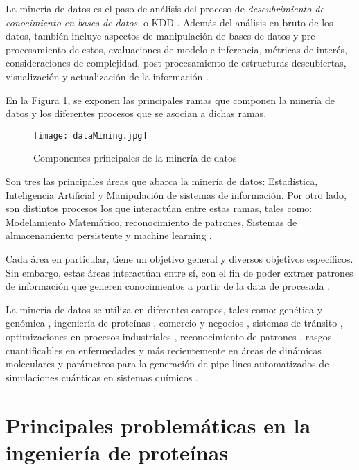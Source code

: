 La minería de datos es el paso de análisis del proceso de \textit{descubrimiento de conocimiento en bases de datos}, o KDD \cite{fayyad1996kdd}. Además del análisis en bruto de los datos, también incluye aspectos de manipulación de bases de datos y pre procesamiento de estos, evaluaciones de modelo e inferencia, métricas de interés, consideraciones de complejidad, post procesamiento de estructuras descubiertas, visualización y actualización de la información \cite{berry2004data}.

En la Figura \ref{intro1}, se exponen las principales ramas que componen la minería de datos y los diferentes procesos que se asocian a dichas ramas.

\begin{figure}[!h]
	
	\centering
	\texttt{[image: dataMining.jpg]}
	\caption{Componentes principales de la minería de datos}
	\label{intro1}
\end{figure}

Son tres las principales áreas que abarca la minería de datos: Estadística, Inteligencia Artificial y Manipulación de sistemas de información. Por otro lado, son distintos procesos los que interactúan entre estas ramas, tales como: Modelamiento Matemático, reconocimiento de patrones, Sistemas de almacenamiento persistente y machine learning \cite{hand2006data}.

Cada área en particular, tiene un objetivo general y diversos objetivos específicos. Sin embargo, estas áreas interactúan entre sí, con el fin de poder extraer patrones de información que generen conocimientos a partir de la data de procesada \cite{berry2004data}.

La minería de datos se utiliza en diferentes campos, tales como: genética y genómica \cite{Lee2008, Rebhan1998}, ingeniería de proteínas \cite{han2009research, 4548625, li2008fast}, comercio y negocios \cite{hofmann2013rapidminer}, sistemas de tránsito \cite{Ma2013}, optimizaciones en procesos industriales \cite{Chien2008, 8051033, 983448}, reconocimiento de patrones \cite{jain1988algorithms, fayyad1996data}, rasgos cuantificables en enfermedades \cite{Yoo2012, obenshain2004, LDuan} y más recientemente en áreas de dinámicas moleculares \cite{Chen2017, Yang:2005:GFM:1081870.1081962} y parámetros para la generación de pipe lines automatizados de simulaciones cuánticas en sistemas químicos \cite{MAO2004787, PhysRevLett.91.135503, Ramakrishnan2015}.


\section{Principales problemáticas en la ingeniería de proteínas}

